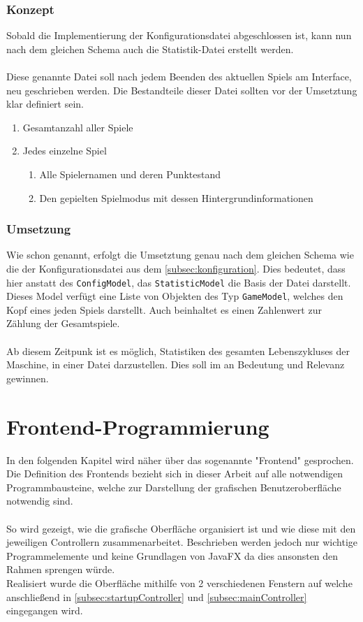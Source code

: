 \subsubsection{Konzept}
Sobald die Implementierung der Konfigurationsdatei abgeschlossen ist, kann nun nach dem gleichen Schema auch die Statistik-Datei erstellt werden.\\\\
Diese genannte Datei soll nach jedem Beenden des aktuellen Spiels am Interface, neu geschrieben werden.
Die Bestandteile dieser Datei sollten vor der Umsetztung klar definiert sein.
\begin{enumerate}
\item Gesamtanzahl aller Spiele
\item Jedes einzelne Spiel
\begin{enumerate}
\item Alle Spielernamen und deren Punktestand
\item Den gepielten Spielmodus mit dessen Hintergrundinformationen
\end{enumerate}
\end{enumerate}
\subsubsection{Umsetzung}
Wie schon genannt, erfolgt die Umsetztung genau nach dem gleichen Schema wie die der Konfigurationsdatei aus dem \autoref{subsec:konfiguration}.
Dies bedeutet, dass hier anstatt des \lstinline[style=java]{ConfigModel}, das \lstinline[style=java]{StatisticModel} die Basis der Datei darstellt.
Dieses Model verfügt eine Liste von Objekten des Typ \lstinline[style=java]{GameModel}, welches den Kopf eines jeden Spiels darstellt.
Auch beinhaltet es einen Zahlenwert zur Zählung der Gesamtspiele.\\\\
Ab diesem Zeitpunk ist es möglich, Statistiken des gesamten Lebenszykluses der Maschine, in einer Datei darzustellen.
Dies soll im  an Bedeutung und Relevanz gewinnen.
\section{Frontend-Programmierung}
In den folgenden Kapitel wird näher über das sogenannte "Frontend" gesprochen.
Die Definition des Frontends bezieht sich in dieser Arbeit auf alle notwendigen Programmbausteine, welche zur Darstellung der grafischen Benutzeroberfläche notwendig sind.\\\\
So wird gezeigt, wie die grafische Oberfläche organisiert ist und wie diese mit den jeweiligen Controllern zusammenarbeitet.
Beschrieben werden jedoch nur wichtige Programmelemente und keine Grundlagen von JavaFX da dies ansonsten den Rahmen sprengen würde.\\
Realisiert wurde die Oberfläche mithilfe von 2 verschiedenen Fenstern auf welche anschließend in \autoref{subsec:startupController} und \autoref{subsec:mainController} eingegangen wird.
